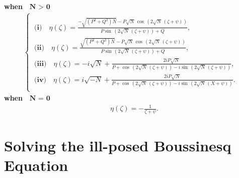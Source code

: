 \documentclass[10pt]{NSP1}
\numberwithin{equation}{section}
\begin{document}
\textbf{when $\textbf{ N $>$ 0} $ }
\begin{align}\label{FAM2}
\begin{cases}\\\
\textbf{(i)}\quad \eta \! \left(\zeta \right) =\frac{-\sqrt{\left(P^{2}+Q^{2}\right) N}-P \sqrt{N}\, \cos \, \left(2 \sqrt{N}\, \left(\zeta +\psi \right)\right)}{P \sin \, \left(2 \sqrt{N}\, \left(\zeta +\psi \right)\right)+Q},\\\
\textbf{(ii)}\quad \eta \! \left(\zeta \right) =\frac{\sqrt{\left(P^{2}+Q^{2}\right) N}-P \sqrt{N}\, \cos \, \left(2 \sqrt{N}\, \left(\zeta +\psi \right)\right)}{P \sin \, \left(2 \sqrt{N}\, \left(\zeta +\psi \right)\right)+Q},\\\
\textbf{(iii)}\quad \eta \! \left(\zeta \right) =-i \sqrt{N}+\frac{2 i P \sqrt{N}}{P +\cos \, \left(2 \sqrt{N}\, \left(\zeta +\psi \right)\right)-i \sin \, \left(2 \sqrt{N}\, \left(\zeta +\psi \right)\right)},\\\
\textbf{(iv)}\quad \eta \! \left(\zeta \right) =i \sqrt{-N}+\frac{2 i P \sqrt{N}}{P +\cos \, \left(2 \sqrt{N}\, \left(\zeta +\psi \right)\right)-i \sin \, \left(2 \sqrt{N}\, \left(X +\psi \right)\right)}.\\
\end{cases}
\end{align}
\textbf{when $\textbf{ N $=$ 0}$ }
\begin{eqnarray}\label{FAM3}
\quad \eta \! \left(\zeta \right) = -\frac{1}{\zeta +\psi}.
\end{eqnarray}
\section{Solving the ill-posed Boussinesq Equation}
\end{document}
